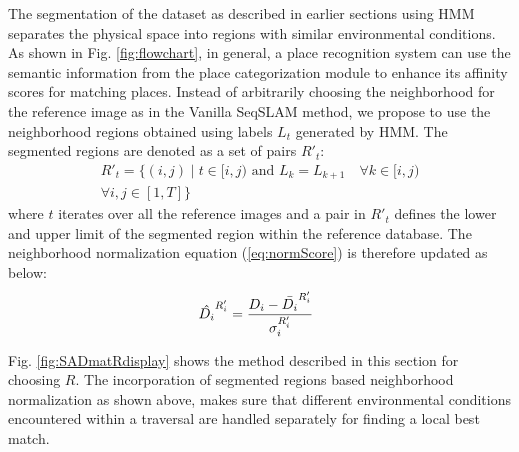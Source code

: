 \documentclass[letterpaper, 10 pt, conference]{ieeeconf}  %
\begin{document}
The segmentation of the dataset as described in earlier sections using HMM separates the physical space into regions with similar environmental conditions. As shown in Fig. \ref{fig:flowchart}, in general, a place recognition system can use the semantic information from the place categorization module to enhance its affinity scores for matching places. Instead of arbitrarily choosing the neighborhood for the reference image as in the Vanilla SeqSLAM method, we propose to use the neighborhood regions obtained using labels $L_t$ generated by HMM. The segmented regions are denoted as a set of pairs $R'_t$:
\begin{equation}
\begin{split}
 R'_t = \{ (i,j) \mid t\in [i,j) \text{ and } L_{k} = L_{k+1} \quad \forall k \in [i,j) \\
 \forall i,j \in [1,T] \}
\end{split}
\end{equation}
where $t$ iterates over all the reference images and a pair in $R'_t$ defines the lower and upper limit of the segmented region within the reference database. The neighborhood normalization equation (\ref{eq:normScore}) is therefore updated as below: 
\begin{equation}
 \hat{D_i}^{R'_i} = \frac{D_i-\bar{D_i}^{R'_i}}{\sigma_i^{R'_i}} \hspace{0.2cm}
 \label{eq:normScoreNew}
\end{equation}

Fig. \ref{fig:SADmatRdisplay} shows the method described in this section for choosing $R$. The incorporation of segmented regions based neighborhood normalization as shown above, makes sure that different environmental conditions encountered within a traversal are handled separately for finding a local best match.
\end{document}
